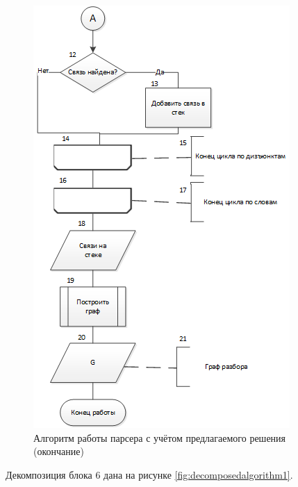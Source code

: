 \begin{figure}[H]
	\centering
		\includegraphics[scale=1.0]{images/modifiedalgorithmB.png}
	\caption{\small Алгоритм работы парсера с учётом предлагаемого решения (окончание)}
	\label{fig:modifiedalgorithmB}
\end{figure}

Декомпозиция блока 6 дана на рисунке \ref{fig:decomposedalgorithm1}.

